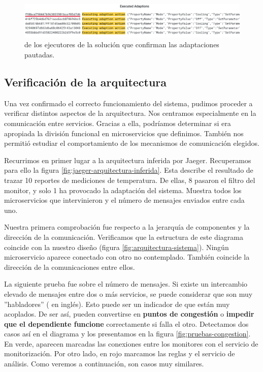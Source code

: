 \begin{figure}[htb]
  \hspace{-0.9cm}
  \includegraphics[scale=1.85]{cap_despliegue/images/Pruebas-logs-adaptaciones}
  \caption{ de los ejecutores de la solución que confirman las adaptaciones pautadas.}
  \label{fig:prueba-logs-adaptaciones}
\end{figure}

\pagebreak

\subsection{Verificación de la arquitectura}

Una vez confirmado el correcto funcionamiento del sistema, pudimos proceder a verificar distintos aspectos de la arquitectura. Nos centramos especialmente en la comunicación entre servicios. Gracias a ella, podríamos determinar si era apropiada la división funcional en microservicios que definimos. También nos permitió estudiar el comportamiento de los mecanismos de comunicación elegidos.

Recurrimos en primer lugar a la arquitectura inferida por Jaeger. Recuperamos para ello la figura \ref{fig:jaeger-arquitectura-inferida}. Esta describe el resultado de trazar 10 reportes de mediciones de temperatura. De ellas, 8 pasaron el filtro del monitor, y solo 1 ha provocado la adaptación del sistema. Muestra todos los microservicios que intervinieron y el número de mensajes enviados entre cada uno.

Nuestra primera comprobación fue respecto a la jerarquía de componentes y la dirección de la comunicación. Verificamos que la estructura de este diagrama coincide con la nuestro diseño (figura \ref{fig:arquitectura-sistema}). Ningún microservicio aparece conectado con otro no contemplado. También coincide la dirección de la comunicaciones entre ellos.

La siguiente prueba fue sobre el número de mensajes. Si existe un intercambio elevado de mensajes entre dos o más servicios, se puede considerar que son muy ''habladores'' ( en inglés). Esto puede ser un indicador de que están muy acoplados. \cite{singjaiPatternsDerivingAPIs2021} De ser así, pueden convertirse en \textbf{puntos de congestión} o \textbf{impedir que el dependiente funcione} correctamente si falla el otro. Detectamos dos casos así en el diagrama y los presentamos en la figura \ref{fig:pruebas-congestion}. En verde, aparecen marcadas las conexiones entre los monitores con el servicio de monitorización. Por otro lado, en rojo marcamos las reglas y el servicio de análisis. Como veremos a continuación, son casos muy similares.

